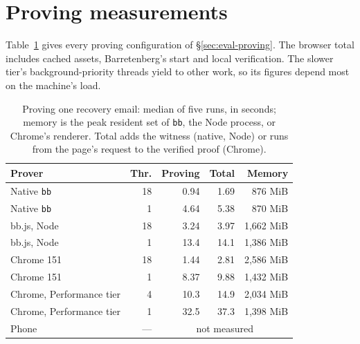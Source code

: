 \section{Proving measurements}\label{app:proving}

Table~\ref{tab:proving} gives every proving configuration of
\S\ref{sec:eval-proving}. The browser total includes cached assets,
Barretenberg's start and local verification. The slower tier's
background-priority threads yield to other work, so its figures depend most
on the machine's load.

\begin{table}[h]
  \caption{Proving one recovery email: median of five runs, in seconds;
    memory is the peak resident set of \texttt{bb}, the Node process, or
    Chrome's renderer. Total adds the witness (native, Node) or runs from
    the page's request to the verified proof (Chrome).}
  \label{tab:proving}
  \small
  \begin{tabularx}{\columnwidth}{@{}>{\raggedright\arraybackslash}X r r r r@{}}
    \toprule
    Prover & Thr. & Proving & Total & Memory \\
    \midrule
    Native \texttt{bb} & 18 & 0.94 & 1.69 & 876 MiB \\
    Native \texttt{bb} & 1 & 4.64 & 5.38 & 870 MiB \\
    bb.js, Node & 18 & 3.24 & 3.97 & 1{,}662 MiB \\
    bb.js, Node & 1 & 13.4 & 14.1 & 1{,}386 MiB \\
    Chrome 151 & 18 & 1.44 & 2.81 & 2{,}586 MiB \\
    Chrome 151 & 1 & 8.37 & 9.88 & 1{,}432 MiB \\
    Chrome, Performance tier & 4 & 10.3 & 14.9 & 2{,}034 MiB \\
    Chrome, Performance tier & 1 & 32.5 & 37.3 & 1{,}398 MiB \\
    Phone & --- & \multicolumn{3}{c}{not measured} \\
    \bottomrule
  \end{tabularx}
\end{table}
